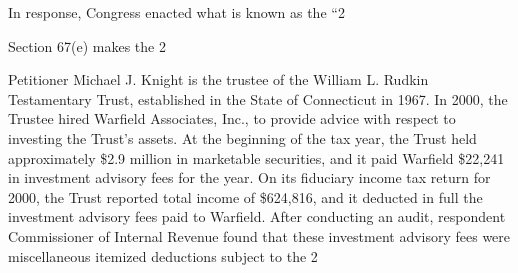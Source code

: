   In response, Congress enacted what is known as the ``2%

  Section 67(e) makes the 2%

  Petitioner Michael J. Knight is the trustee of the William L. Rudkin Testamentary Trust, established in the State of Connecticut in 1967. In 2000, the Trustee hired Warfield Associates, Inc., to provide advice with respect to investing the Trust's assets. At the beginning of the tax year, the Trust held approximately \$2.9 million in marketable securities, and it paid Warfield \$22,241 in investment advisory fees for the year. On its fiduciary income tax return for 2000, the Trust reported total income of \$624,816, and it deducted in full the investment advisory fees paid to Warfield. After conducting an audit, respondent Commissioner of Internal Revenue found that these investment advisory fees were miscellaneous itemized deductions subject to the 2%

